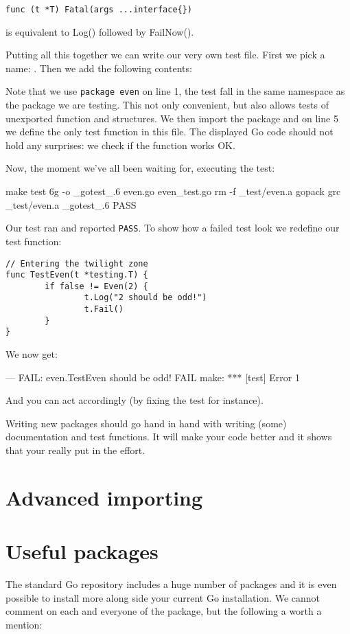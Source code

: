 \begin{lstlisting}[numbers=none]
func (t *T) Fatal(args ...interface{})
\end{lstlisting}
 is equivalent to Log() followed by FailNow().

Putting all this together we can write our very own test file. First
we pick a name: . Then we add the following contents:

Note that we use \lstinline{package even} on line 1, the test fall in the same
namespace as the package we are testing. This not only convenient, but
also allows tests of unexported function and structures. We then import
the  package and on line 5 we define the only test
function in this file. The displayed Go code should not hold any
surprises: we check if the  function works OK. 

Now, the moment we've all been waiting for, executing the test:
\begin{display}
\pr make test
6g -o \_gotest\_.6 even.go  even\_test.go
rm -f \_test/even.a
gopack grc \_test/even.a \_gotest\_.6 
PASS
\end{display}
\noindent{}Our test ran and reported \texttt{PASS}. To show how a failed
test look we redefine our test function:
\begin{lstlisting}
// Entering the twilight zone
func TestEven(t *testing.T) {
        if false != Even(2) {
                t.Log("2 should be odd!")
                t.Fail()
        }   
}
\end{lstlisting}
We now get:
\begin{display}
--- FAIL: even.TestEven
\qquad{} should be odd!
FAIL
make: *** [test] Error 1
\end{display}
\noindent{}And you can act accordingly (by fixing the test for instance).

\begin{lbar}
Writing new packages should go hand in hand with writing (some)
documentation and test functions. It will make your code better and it
shows that your really put in the effort.
\end{lbar}

\section{Advanced importing}

\section{Useful packages}
The standard Go repository includes a huge number of packages and it is
even possible to install more along side your current Go installation. 
We cannot comment on each and everyone of the package, but the following
a worth a mention:

